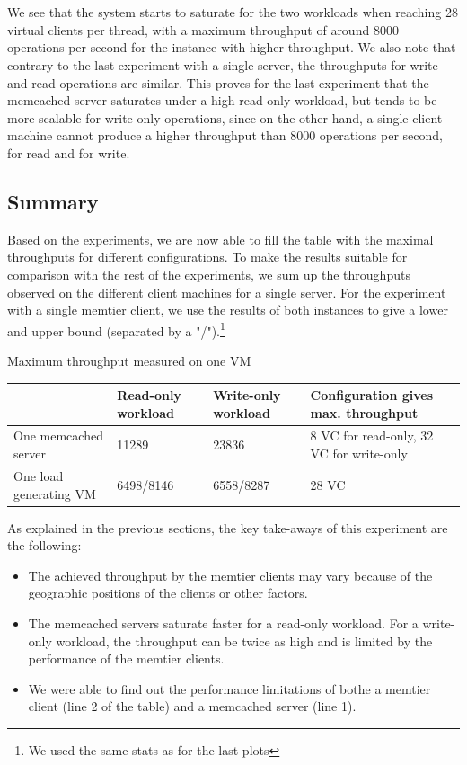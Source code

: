\documentclass[11pt,a4paper]{article}
\begin{document}
\\
\\
We see that the system starts to saturate for the two workloads when reaching 28 virtual clients per thread, with a maximum throughput of around 8000 operations per second for the instance with higher throughput.  
We also note that contrary to the last experiment with a single server, the throughputs for write and read operations are similar. This proves for the last experiment that the memcached server saturates under a high read-only workload, but tends to be more scalable for write-only operations, since on the other hand, a single client machine cannot produce a higher throughput than 8000 operations per second, for read and for write.   
\subsection{Summary}


Based on the experiments, we are now able to fill the table with the maximal throughputs for different configurations. To make the results suitable for comparison with the rest of the experiments, we sum up the throughputs observed on the different client machines for a single server. For the experiment with a single memtier client, we use the results of both instances to give a lower and upper bound (separated by a "/").\footnote{We used the same stats as for the last plots}

\begin{center}
	{Maximum throughput measured on one VM}
	\begin{tabular}{|l|p{2cm}|p{2cm}|p{4cm}|}
		\hline                        & Read-only workload & Write-only workload & Configuration gives max. throughput \\ 
		\hline One memcached server   &11289                    &23836                     &8 VC for read-only, 32  VC for write-only                                     \\ 
		\hline One load generating VM &6498/8146                    &6558/8287                     &28 VC                                     \\ 
		\hline 
	\end{tabular}
\end{center}
As explained in the previous sections, the key take-aways of this experiment are the following:

\begin{itemize}
\item The achieved throughput by the memtier clients may vary because of the geographic positions of the clients or other factors. 
\item The memcached servers saturate faster for a read-only workload. For a write-only workload, the throughput can be twice as high and is limited by the performance of the memtier clients. 
\item We were able to find out the performance limitations of bothe a memtier client (line 2 of the table) and a memcached server (line 1). 
\end{itemize}
\newpage
\end{document}
